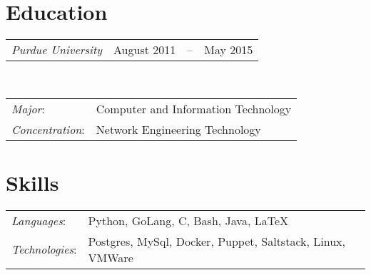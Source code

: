 \documentclass[line,margin]{res}
\begin{document}
  \name{\textcolor{TealBlue}{Ethan Madden}}
  \address{ethan@madden.ninja -- (812) 250-1419}%
  \address{2049 NW 60th St, Seattle WA 98107}

\begin{resume}
  \setlength\tabcolsep{2pt}
  \section{\textcolor{TealBlue}{Education}} 
    \begin{tabular}{@{} p{} r c l @{}}
      {\sl Purdue University\/} & August 2011 & -- & May 2015 %
    \end{tabular}\\
    \begin{tabular}{l l}
      {\sl Major\/}:& Computer and Information Technology \\
      {\sl Concentration\/}:& Network Engineering Technology
    \end{tabular}

  \section{\textcolor{TealBlue}{Skills}} 
    \begin{tabular}{l l}
      {\sl Languages\/}:& Python, GoLang, C, Bash, Java, \LaTeX{} \\
      {\sl Technologies\/}:& Postgres, MySql, Docker, Puppet, Saltstack, Linux, VMWare
    \end{tabular}


\end{resume}
\end{document}
